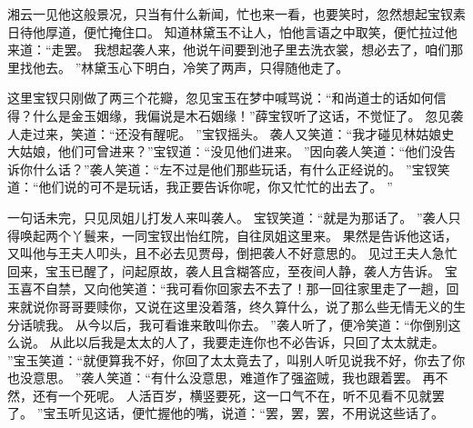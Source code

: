 湘云一见他这般景况，只当有什么新闻，忙也来一看，也要笑时，忽然想起宝钗素日待他厚道，便忙掩住口。
知道林黛玉不让人，怕他言语之中取笑，便忙拉过他来道：“走罢。
我想起袭人来，他说午间要到池子里去洗衣裳，想必去了，咱们那里找他去。
”林黛玉心下明白，冷笑了两声，只得随他走了。
\par
这里宝钗只刚做了两三个花瓣，忽见宝玉在梦中喊骂说：“和尚道士的话如何信得？什么是金玉姻缘，我偏说是木石姻缘！”薛宝钗听了这话，不觉怔了。
忽见袭人走过来，笑道：“还没有醒呢。
”宝钗摇头。
袭人又笑道：“我才碰见林姑娘史大姑娘，他们可曾进来？”宝钗道：“没见他们进来。
”因向袭人笑道：“他们没告诉你什么话？”袭人笑道：“左不过是他们那些玩话，有什么正经说的。
”宝钗笑道：“他们说的可不是玩话，我正要告诉你呢，你又忙忙的出去了。
”\par
一句话未完，只见凤姐儿打发人来叫袭人。
宝钗笑道：“就是为那话了。
”袭人只得唤起两个丫鬟来，一同宝钗出怡红院，自往凤姐这里来。
果然是告诉他这话，又叫他与王夫人叩头，且不必去见贾母，倒把袭人不好意思的。
见过王夫人急忙回来，宝玉已醒了，问起原故，袭人且含糊答应，至夜间人静，袭人方告诉。
宝玉喜不自禁，又向他笑道：“我可看你回家去不去了！那一回往家里走了一趟，回来就说你哥哥要赎你，又说在这里没着落，终久算什么，说了那么些无情无义的生分话唬我。
从今以后，我可看谁来敢叫你去。
”袭人听了，便冷笑道：“你倒别这么说。
从此以后我是太太的人了，我要走连你也不必告诉，只回了太太就走。
”宝玉笑道：“就便算我不好，你回了太太竟去了，叫别人听见说我不好，你去了你也没意思。
”袭人笑道：“有什么没意思，难道作了强盗贼，我也跟着罢。
再不然，还有一个死呢。
人活百岁，横竖要死，这一口气不在，听不见看不见就罢了。
”宝玉听见这话，便忙握他的嘴，说道：“罢，罢，罢，不用说这些话了。
